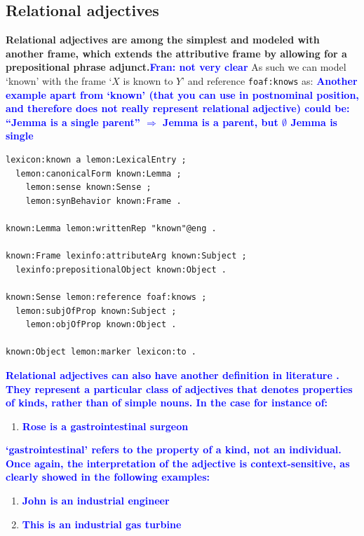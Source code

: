 \documentclass[11pt]{article}
\begin{document}
\subsection{Relational adjectives}

\textbf{Relational adjectives are among the simplest and modeled with another frame,
which extends the attributive frame by allowing for a prepositional phrase
adjunct.\textcolor{blue}{Fran: not very clear}} As such we can model `known' with the frame `$X$ is known to $Y$' and
reference {\tt foaf:knows} as:
\textbf{\textcolor{blue}{Another example apart from `known' (that you can use in postnominal position, and therefore does not really represent relational adjective) could be: ``Jemma is a single parent'' $\Rightarrow$ Jemma is a parent, but $\emptyset$ Jemma is single}}


\begin{verbatim}
lexicon:known a lemon:LexicalEntry ;
  lemon:canonicalForm known:Lemma ;
	lemon:sense known:Sense ;
	lemon:synBehavior known:Frame .

known:Lemma lemon:writtenRep "known"@eng .

known:Frame lexinfo:attributeArg known:Subject ;
  lexinfo:prepositionalObject known:Object .

known:Sense lemon:reference foaf:knows ;
  lemon:subjOfProp known:Subject ;
	lemon:objOfProp known:Object .
	
known:Object lemon:marker lexicon:to .
\end{verbatim}

\textbf{\textcolor{blue}{Relational adjectives can also have another definition in literature \cite{morzycki2013nonscales}. They represent a particular class of adjectives that denotes properties of kinds, rather than of simple nouns. In the case for instance of:}}

\begin{enumerate}[resume]
\item \textbf{\textcolor{blue}{Rose is a gastrointestinal surgeon}} \label{ex:gastro}
\end{enumerate}

\textbf{\textcolor{blue}{`gastrointestinal' refers to the property of a kind, not an individual. Once again, the interpretation of the adjective is context-sensitive, as clearly showed in the following examples:}}

\begin{enumerate}[resume]
\item \textbf{\textcolor{blue}{John is an industrial engineer}} \label{ex:industrial}
\item \textbf{\textcolor{blue}{This is an industrial gas turbine}}
\end{enumerate}
\end{document}
